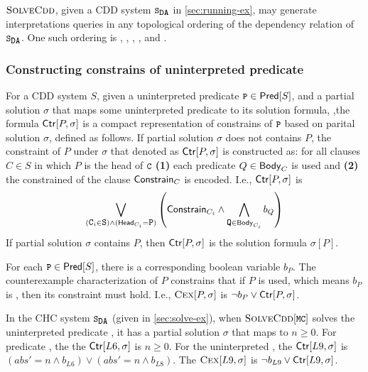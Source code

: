 %
\begin{ex}
  $\textsc{SolveCdd}$, given a CDD system $\mcchc$ in \autoref{sec:running-ex}, may generate
  interpretations queries in any topological ordering of the
  dependency relation of $\mcchc$.
  One such ordering is , , , 
   ,  and .
\end{ex}

\subsubsection{Constructing constrains of uninterpreted 
predicate}
%
For a CDD system $S$, given a uninterpreted predicate $\cc{P} \in \predof{S}$, and a partial 
solution $\sigma$ that maps some uninterpreted predicate to its solution formula, 
,the formula $\mathsf{Ctr}[P,\sigma]$ is a compact representation of constrains of $\cc{P}$ based on parital
solution $\sigma$, defined as follows.
If partial solution $\sigma$ does not contains $P$, 
the constraint of $P$ under $\sigma$ that denoted as $\mathsf{Ctr}[P,\sigma]$ 
is constructed as: for all clauses $C \in S$ in which $P$ is the head of $\cc{C}$
\textbf{(1)} each predicate $Q \in \mathsf{Body}_{C}$ is used and 
\textbf{(2)} the constrained of the clause $\mathsf{Constrain}_{C}$ is encoded.
%
I.e., $\mathsf{Ctr}[P,\sigma]$ is
\[
\biglor_{ (\cc{C}_i \in \cc{S}) \land (\headof{C_i} = \cc{P})}
\left( \consof{C_i} \land %
\bigland_{ \cc{Q} \in \bodyof{C_i}} %
b_Q \right)
\]
%
If partial solution $\sigma$ contains $P$, then $\mathsf{Ctr}[P,\sigma]$ is the solution formula $\sigma[P]$.

For each $\cc{P} \in \predof{S}$, there is a corresponding boolean variable
$b_P$.
%
The counterexample characterization of $P$ constrains that
if $P$ is used, which means $b_{P}$ is , then its constraint must hold.
%
I.e., $\textsc{Cex}[{P,\sigma}]$ is $\neg b_{P} \lor \mathsf{Ctr}[P,\sigma]$.


\begin{ex}
  \label{ex:ctr}
  In the CHC system $\mcchc$ (given in \autoref{sec:solve-ex}), 
  when $\mcsolve$ solves the uninterpreted predicate , it 
  has a partial solution $\sigma$ that maps  to $n \ge 0$.
  For predicate , the the $\mathsf{Ctr}[L6,\sigma]$ is $n \ge 0$.
  For the 
  uninterpreted , the $\mathsf{Ctr}[L9,\sigma]$ is $(abs' = n \land b_{L6}) \lor (abs' = n \land b_{L8})$.
  The $\textsc{Cex}[{L9,\sigma}]$ is $\neg b_{L9} \lor \mathsf{Ctr}[L9,\sigma]$.
\end{ex}

